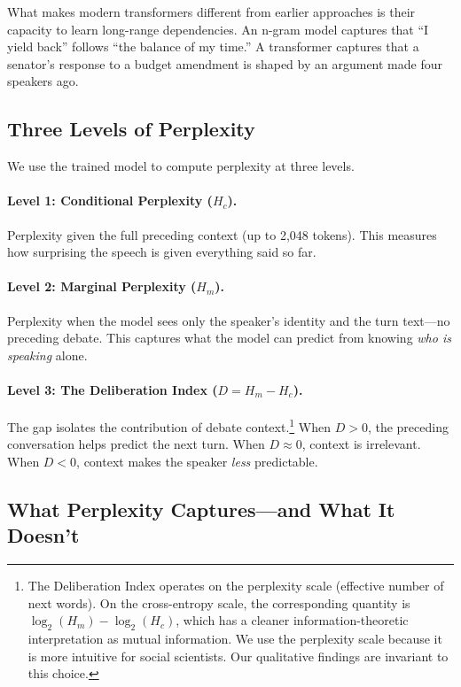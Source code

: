 \documentclass[12pt]{article}
\newcommand{\Hc}{H_c}
\newcommand{\Hm}{H_m}
\newcommand{\DI}{\mathit{D}}
\begin{document}
What makes modern transformers \citep{vaswani2017} different from earlier approaches is their capacity to learn long-range dependencies. An n-gram model captures that ``I yield back'' follows ``the balance of my time.'' A transformer captures that a senator's response to a budget amendment is shaped by an argument made four speakers ago.

\subsection{Three Levels of Perplexity}

We use the trained model to compute perplexity at three levels.

\paragraph{Level 1: Conditional Perplexity ($\Hc$).} Perplexity given the full preceding context (up to 2,048 tokens). This measures how surprising the speech is given everything said so far.

\paragraph{Level 2: Marginal Perplexity ($\Hm$).} Perplexity when the model sees only the speaker's identity and the turn text---no preceding debate. This captures what the model can predict from knowing \textit{who is speaking} alone.

\paragraph{Level 3: The Deliberation Index ($\DI = \Hm - \Hc$).} The gap isolates the contribution of debate context.\footnote{The Deliberation Index operates on the perplexity scale (effective number of next words). On the cross-entropy scale, the corresponding quantity is $\log_2(\Hm) - \log_2(\Hc)$, which has a cleaner information-theoretic interpretation as mutual information. We use the perplexity scale because it is more intuitive for social scientists. Our qualitative findings are invariant to this choice.} When $\DI > 0$, the preceding conversation helps predict the next turn. When $\DI \approx 0$, context is irrelevant. When $\DI < 0$, context makes the speaker \textit{less} predictable.

\subsection{What Perplexity Captures---and What It Doesn't}
\end{document}
